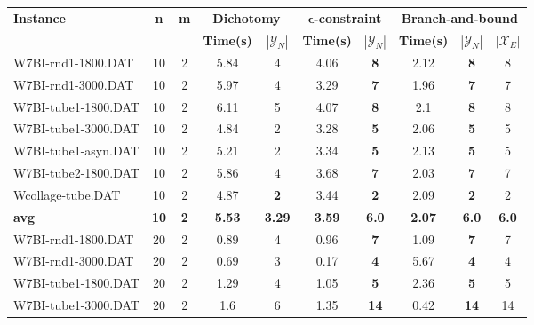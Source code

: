 \begin{table}[h]
\centering
\hspace*{-1cm}\begin{tabular}{lccccccccc}
\toprule
\textbf{Instance} & \textbf{n} & \textbf{m} & \multicolumn{2}{c}{\textbf{Dichotomy}} & \multicolumn{2}{c}{\textbf{$\mathbf{\epsilon}$-constraint}}  & \multicolumn{3}{c}{\textbf{Branch-and-bound}}
\\
\cmidrule(r){4-5} \cmidrule(r){6-7} \cmidrule(r){8-10}
~ & ~ & ~ & \textbf{Time(s)} & \textbf{$|\mathcal{Y}_N|$} & \textbf{Time(s)} & \textbf{$|\mathcal{Y}_N|$} & \textbf{Time(s)} & \textbf{$|\mathcal{Y}_N|$} & \textbf{$|\mathcal{X}_E|$} \\
\midrule

W7BI-rnd1-1800.DAT & 10 & 2 & 5.84 & 4 & 4.06 &  \textbf{8} &  \textcolor{blue2}{2.12} &  \textbf{8}  & 8 \\
W7BI-rnd1-3000.DAT & 10 & 2 & 5.97 & 4 & 3.29 &  \textbf{7} &  \textcolor{blue2}{1.96} &  \textbf{7}  & 7 \\
W7BI-tube1-1800.DAT & 10 & 2 & 6.11 & 5 & 4.07 &  \textbf{8} &  \textcolor{blue2}{2.1} &  \textbf{8}  & 8 \\
W7BI-tube1-3000.DAT & 10 & 2 & 4.84 & 2 & 3.28 &  \textbf{5} &  \textcolor{blue2}{2.06} &  \textbf{5}  & 5 \\
W7BI-tube1-asyn.DAT & 10 & 2 & 5.21 & 2 & 3.34 &  \textbf{5} &  \textcolor{blue2}{2.13} &  \textbf{5}  & 5 \\
W7BI-tube2-1800.DAT & 10 & 2 & 5.86 & 4 & 3.68 &  \textbf{7} &  \textcolor{blue2}{2.03} &  \textbf{7}  & 7 \\
Wcollage-tube.DAT & 10 & 2 & 4.87 &  \textbf{2} & 3.44 &  \textbf{2} &  \textcolor{blue2}{2.09} &  \textbf{2}  & 2 \\
\cline{1-10} \textbf{avg} & \textbf{10} & \textbf{2} & \textbf{5.53} & \textbf{3.29} & \textbf{3.59} & \textbf{6.0} & \textbf{2.07} & \textbf{6.0} & \textbf{6.0} \\ \cline{1-10}
W7BI-rnd1-1800.DAT & 20 & 2 &  \textcolor{blue2}{0.89} & 4 & 0.96 &  \textbf{7} & 1.09 &  \textbf{7}  & 7 \\
W7BI-rnd1-3000.DAT & 20 & 2 & 0.69 & 3 &  \textcolor{blue2}{0.17} &  \textbf{4} & 5.67 &  \textbf{4}  & 4 \\
W7BI-tube1-1800.DAT & 20 & 2 & 1.29 & 4 &  \textcolor{blue2}{1.05} &  \textbf{5} & 2.36 &  \textbf{5}  & 5 \\
W7BI-tube1-3000.DAT & 20 & 2 & 1.6 & 6 & 1.35 &  \textbf{14} &  \textcolor{blue2}{0.42} &  \textbf{14}  & 14 \\

\end{tabular}
\end{table}
